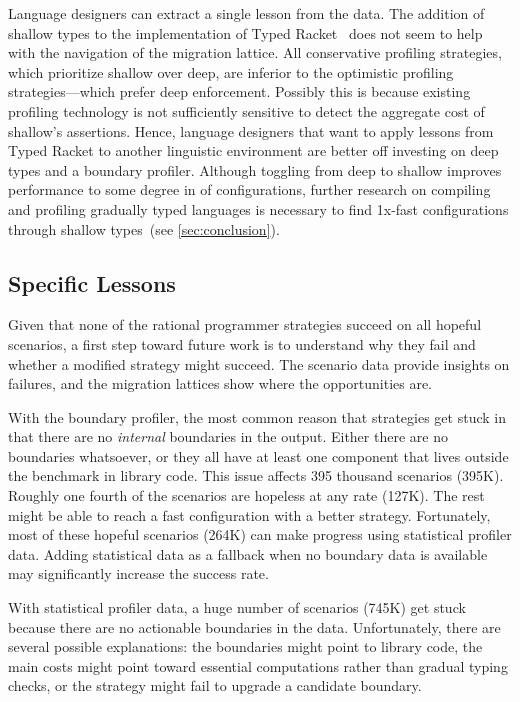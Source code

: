 Language designers can extract a single lesson from the data.  The
addition of shallow types to the implementation of Typed
Racket~\cite{g-deep-shallow} does not seem to help with the navigation of
the migration lattice. All conservative profiling strategies, which
prioritize shallow over deep, are inferior to the optimistic profiling
strategies---which prefer deep enforcement. Possibly this is because
existing profiling technology is not sufficiently sensitive to detect the
aggregate cost of shallow's assertions.  Hence, language designers that
want to apply lessons from Typed Racket to another linguistic environment
are better off investing on deep types and a boundary profiler.
Although toggling from deep to shallow improves performance to some degree in
 of configurations, further research on compiling and profiling
gradually typed languages is necessary to find 1x-fast configurations through
shallow types~(see \cref{sec:conclusion}).


\subsection{Specific Lessons}
\label{s:specific-lessons}

Given that none of the rational programmer strategies
succeed on all hopeful scenarios, a first step toward
future work is to understand why they fail and whether
a modified strategy might succeed.
The scenario data provide insights on failures,
and the migration lattices show where the opportunities are.

With the boundary profiler, the most common reason
that strategies get stuck in that there are no
\emph{internal} boundaries in the output.
Either there are no boundaries whatsoever, or they all have at least one
component that lives outside the benchmark in library code.
This issue affects 395 thousand scenarios (395K).
Roughly one fourth of the scenarios are hopeless at any rate (127K).
The rest might be able to reach a fast configuration with a better strategy.
Fortunately, most of these hopeful scenarios (264K) can make progress
using statistical profiler data.
Adding statistical data as a fallback when no boundary data is available
may significantly increase the success rate.

With statistical profiler data, a huge number of scenarios (745K) get stuck
because there are no actionable boundaries in the data.
Unfortunately, there are several possible explanations:
the boundaries might point to library code, the main costs might point toward
essential computations rather than gradual typing checks, or the strategy
might fail to upgrade a candidate boundary.

